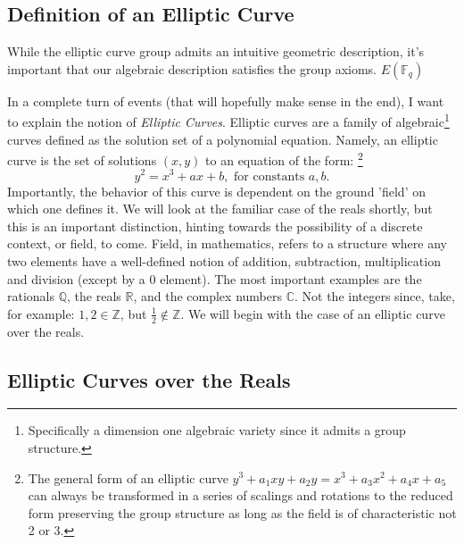 \documentclass[11pt, a4paper]{report}
\newcommand{\integers}{\mathbb{Z}}
\newcommand{\rationals}{\mathbb{Q}}
\newcommand{\reals}{\mathbb{R}}
\newcommand{\complexes}{\mathbb{C}}
\newcommand{\field}{\mathbb{F}}
\begin{document}
\subsection{Definition of an Elliptic Curve}
While the elliptic curve group admits an intuitive geometric description, it's important that our algebraic description satisfies the group axioms.  $ E(\field_{q} )$ 

In a complete turn of events (that will hopefully make sense in the end), I want to explain the notion of \textit{Elliptic Curves}. Elliptic curves are a family of  algebraic\footnote{Specifically a dimension one algebraic variety since it admits a group structure.} curves defined as the solution set of a polynomial equation. Namely, an elliptic curve is the set of solutions $(x,y)$ to an equation of the form:\autocite[10]{koblitz} \footnote{The general form of an elliptic curve $y^3 + a_1xy + a_2y = x^3 + a_3x^2 + a_4x + a_5$ can always be transformed in a series of scalings and rotations to the reduced form preserving the group structure as long as the field is of characteristic not 2 or 3.}
\[y^2 = x^3 + ax + b, \text{ for constants } a,b.\]
Importantly, the behavior of this curve is dependent on the ground 'field' on which one defines it. We will look at the familiar case of the reals shortly, but this is an important distinction, hinting towards the possibility of a discrete context, or field, to come. Field, in mathematics, refers to a structure where any two elements have a well-defined notion of addition, subtraction, multiplication and division (except by a 0 element). The most important examples are the rationals $\rationals$, the reals $\reals$, and the complex numbers $\complexes$. Not the integers since, take, for example: $1, 2 \in \integers$, but $\frac{1}{2} \notin \integers$. We will begin with the case of an elliptic curve over the reals.

\subsection{Elliptic Curves over the Reals}
\end{document}
